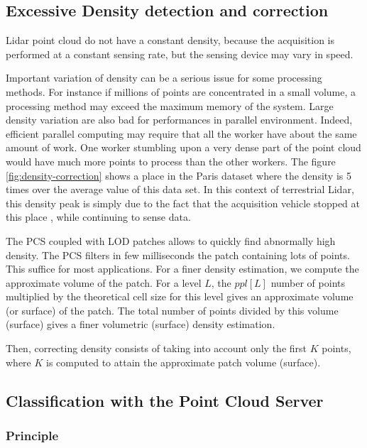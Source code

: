 	\subsection{Excessive Density detection and correction}
		\label{method.density}
		Lidar point cloud do not have a constant density, because the acquisition is performed at a constant sensing rate, but the sensing device may vary in speed.
		
		Important variation of density can be a serious issue for some processing methods. 
		For instance if millions of points are concentrated in a small volume,
		a processing method may exceed the maximum memory of the system.
		Large density variation are also bad for performances in parallel environment.
		Indeed, efficient parallel computing may require that all the worker have about the same amount of work.
		One worker stumbling upon a very dense part of the point cloud would have much more points to process than the other workers.
		The figure \ref{fig:density-correction} shows a place in the Paris dataset where the density is 5 times over the average value of this data set.
		In this context of terrestrial Lidar, this density peak is simply due to the fact that the acquisition vehicle stopped at this place
		, while continuing to sense data.
		
		The PCS coupled with LOD patches allows to quickly find abnormally high density.
		The PCS filters in few milliseconds the patch containing lots of points. This suffice for most applications.
		For a finer density estimation, we compute the approximate volume of the patch.
		For a level $L$, the $ppl[L]$ number of points multiplied by the theoretical cell size for this level gives an approximate volume (or surface) of the patch.
		The total number of points divided by this volume (surface) gives a finer volumetric (surface) density estimation.
		
		Then, correcting density consists of taking into account only the first $K$ points, where $K$ is computed to attain the approximate patch volume (surface).
		
		
	\subsection{Classification with the Point Cloud Server}
		\label{method.classif}
		\subsubsection{Principle}
		
